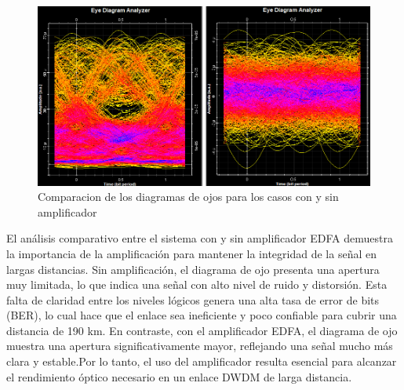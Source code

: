 \begin{enumerate}
\begin{itemize}
\begin{figure}
			\centering
			\includegraphics[width=0.9\linewidth]{img/Figure_6_5}
			\caption{Comparacion de los diagramas de ojos para los casos con y sin amplificador}
			\label{fig:13}
		\end{figure}
	\end{itemize}
	El análisis comparativo entre el sistema con y sin amplificador EDFA demuestra la importancia de la amplificación para mantener la integridad de la señal en largas distancias. Sin amplificación, el diagrama de ojo presenta una apertura muy limitada, lo que indica una señal con alto nivel de ruido y distorsión. Esta falta de claridad entre los niveles lógicos genera una alta tasa de error de bits (BER), lo cual hace que el enlace sea ineficiente y poco confiable para cubrir una distancia de 190 km. En contraste, con el amplificador EDFA, el diagrama de ojo muestra una apertura significativamente mayor, reflejando una señal mucho más clara y estable.Por lo tanto, el uso del amplificador resulta esencial para alcanzar el rendimiento óptico necesario en un enlace DWDM de larga distancia.
\end{enumerate}